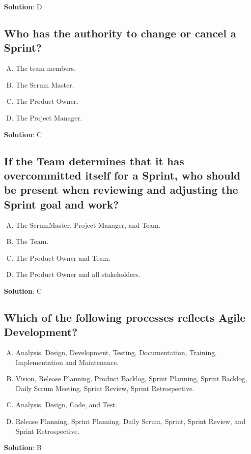 \textbf{Solution}: D


\subsection{Who has the authority to change or cancel a Sprint? }
\begin{enumerate}[A)]
  \item The team members.
  \item The Scrum Master.
  \item The Product Owner.
  \item The Project Manager.
\end{enumerate}


\textbf{Solution}: C


\subsection{If the Team determines that it has overcommitted itself for a Sprint, who should be present when reviewing and adjusting the Sprint goal and work?}
\begin{enumerate}[A)]
  \item The ScrumMaster, Project Manager, and Team.
  \item The Team.
  \item The Product Owner and Team.
  \item The Product Owner and all stakeholders.
\end{enumerate}


\textbf{Solution}: C


\subsection{Which of the following processes reflects Agile Development?}
\begin{enumerate}[A)]
  \item Analysis, Design, Development, Testing, Documentation, Training, Implementation and Maintenance.
  \item Vision, Release Planning, Product Backlog, Sprint Planning, Sprint Backlog, Daily Scrum Meeting, Sprint Review, Sprint Retrospective.
  \item Analysis, Design, Code, and Test.
  \item Release Planning, Sprint Planning, Daily Scrum, Sprint, Sprint Review, and Sprint Retrospective.
\end{enumerate}


\textbf{Solution}: B


